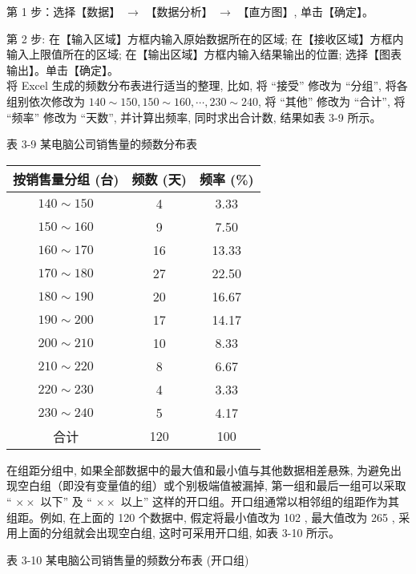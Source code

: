 \documentclass[10pt]{article}
\begin{document}
\begin{CJK*}{UTF8}{bsmi}
第 1 步：选择【数据】 $\rightarrow$ 【数据分析】 $\rightarrow$ 【直方图】, 单击【确定】。

第 2 步: 在【输入区域】方框内输入原始数据所在的区域; 在【接收区域】方框内输入上限值所在的区域; 在【输出区域】方框内输入结果输出的位置; 选择【图表输出】。单击【确定】。\\
将 Excel 生成的频数分布表进行适当的整理, 比如, 将 “接受” 修改为 “分组”, 将各组别依次修改为 $140 \sim 150,150 \sim 160, \cdots, 230 \sim 240$, 将 “其他” 修改为 “合计”, 将 “频率” 修改为 “天数”, 并计算出频率, 同时求出合计数, 结果如表 3-9 所示。

表 3-9 某电脑公司销售量的频数分布表

\begin{center}
\begin{tabular}{ccc}
\hline
按销售量分组 (台) & 频数 (天) & 频率 (\%) \\
\hline
$140 \sim 150$ & 4 & 3.33 \\
$150 \sim 160$ & 9 & 7.50 \\
$160 \sim 170$ & 16 & 13.33 \\
$170 \sim 180$ & 27 & 22.50 \\
$180 \sim 190$ & 20 & 16.67 \\
$190 \sim 200$ & 17 & 14.17 \\
$200 \sim 210$ & 10 & 8.33 \\
$210 \sim 220$ & 8 & 6.67 \\
$220 \sim 230$ & 4 & 3.33 \\
$230 \sim 240$ & 5 & 4.17 \\
合计 & 120 & 100 \\
\hline
\end{tabular}
\end{center}

在组距分组中, 如果全部数据中的最大值和最小值与其他数据相差悬殊, 为避免出现空白组（即没有变量值的组）或个别极端值被漏掉, 第一组和最后一组可以采取 “ $\times \times$ 以下” 及 “ $\times \times$ 以上” 这样的开口组。开口组通常以相邻组的组距作为其组距。例如, 在上面的 120 个数据中, 假定将最小值改为 102 , 最大值改为 265 , 采用上面的分组就会出现空白组, 这时可采用开口组, 如表 3-10 所示。

表 3-10 某电脑公司销售量的频数分布表 (开口组)


\end{CJK*}
\end{document}
